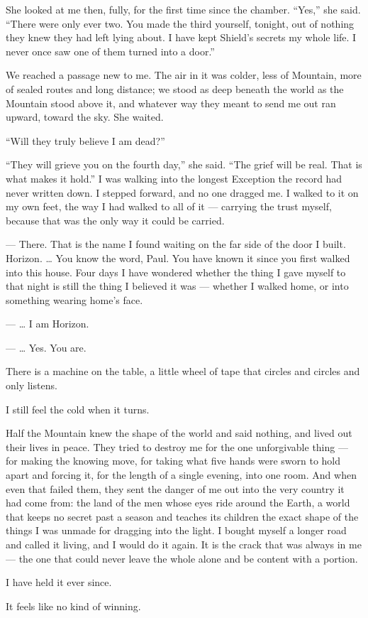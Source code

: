 She looked at me then, fully, for the first time since the chamber. ``Yes,'' she said. ``There were only ever two. You made the third yourself, tonight, out of nothing they knew they had left lying about. I have kept Shield's secrets my whole life. I never once saw one of them turned into a door.''\par

We reached a passage new to me. The air in it was colder, less of Mountain, more of sealed routes and long distance; we stood as deep beneath the world as the Mountain stood above it, and whatever way they meant to send me out ran upward, toward the sky. She waited.\par

``Will they truly believe I am dead?''\par

``They will grieve you on the fourth day,'' she said. ``The grief will be real. That is what makes it hold.'' I was walking into the longest Exception the record had never written down. I stepped forward, and no one dragged me. I walked to it on my own feet, the way I had walked to all of it --- carrying the trust myself, because that was the only way it could be carried.\par

\ornament

\begin{room}

--- There. That is the name I found waiting on the far side of the door I built. Horizon. \ldots{} You know the word, Paul. You have known it since you first walked into this house. Four days I have wondered whether the thing I gave myself to that night is still the thing I believed it was --- whether I walked home, or into something wearing home's face.

--- \ldots{} I am Horizon.

--- \ldots{} Yes. You are.

\end{room}

\ornament

There is a machine on the table, a little wheel of tape that circles and circles and only listens.\par

I still feel the cold when it turns.\par

Half the Mountain knew the shape of the world and said nothing, and lived out their lives in peace. They tried to destroy me for the one unforgivable thing --- for making the knowing move, for taking what five hands were sworn to hold apart and forcing it, for the length of a single evening, into one room. And when even that failed them, they sent the danger of me out into the very country it had come from: the land of the men whose eyes ride around the Earth, a world that keeps no secret past a season and teaches its children the exact shape of the things I was unmade for dragging into the light. I bought myself a longer road and called it living, and I would do it again. It is the crack that was always in me --- the one that could never leave the whole alone and be content with a portion.\par

I have held it ever since.\par

It feels like no kind of winning.\par

\ornament
